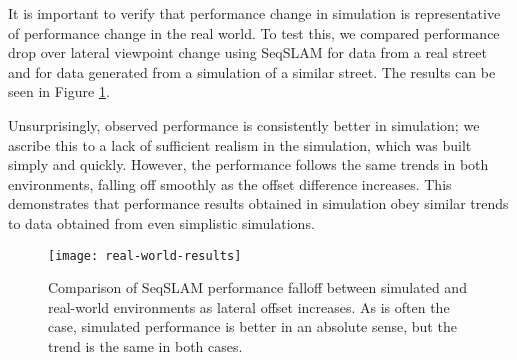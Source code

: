 \documentclass[letterpaper, 10 pt, conference]{ieeeconf}  %
\begin{document}
It is important to verify that performance change in simulation is representative of performance change in the real world. To test this, we compared performance drop over lateral viewpoint change using SeqSLAM for data from a real street and for data generated from a simulation of a similar street. The results can be seen in Figure \ref{fig:real-world-results}.

Unsurprisingly, observed performance is consistently better in simulation; we ascribe this to a lack of sufficient realism in the simulation, which was built simply and quickly. However, the performance follows the same trends in both environments, falling off smoothly as the offset difference increases. This demonstrates that performance results obtained in simulation obey similar trends to data obtained from even simplistic simulations.

\begin{figure}[t]
    \texttt{[image: real-world-results]}
    \caption{Comparison of SeqSLAM performance falloff between simulated and real-world environments as lateral offset increases. As is often the case, simulated performance is better in an absolute sense, but the trend is the same in both cases.}
    \label{fig:real-world-results}
\end{figure}



\end{document}
